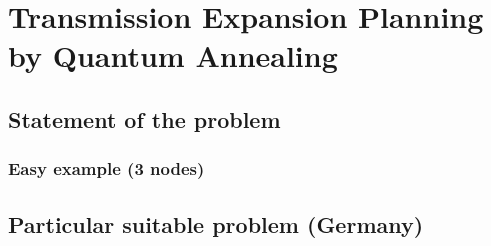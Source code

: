 
\chapter{Transmission Expansion Planning by Quantum Annealing} %

\label{Chapter3} %


\section{Statement of the problem}
\subsection{Easy example (3 nodes)}
\section{Particular suitable problem (Germany)}



